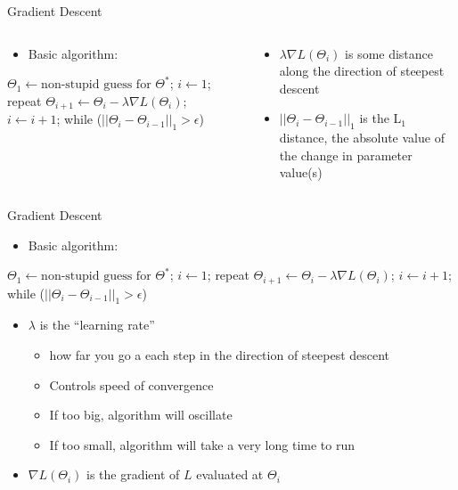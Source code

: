 \documentclass[aspectratio=169]{beamer}
\newenvironment{noindentitemize}
{ \begin{itemize}
 \setlength{\itemsep}{1.5ex}
  \setlength{\parsep}{0pt}   
  \setlength{\parskip}{0pt}
 \addtolength{\leftskip}{-2em}
 }
{ \end{itemize} }
\begin{document}
\begin{frame}[fragile]{Gradient Descent}

\begin{columns}[T]
\begin{column}{0.3\textwidth}
\begin{noindentitemize}
\item Basic algorithm:
\end{noindentitemize}
\begin{SQL}
$\Theta_1 \leftarrow \textrm{non-stupid guess for } \Theta^*$;
$i \leftarrow 1$;
repeat {
  $\Theta_{i + 1} \leftarrow \Theta_{i} - \lambda \nabla L (\Theta_{i})$;
  $i \leftarrow i + 1$;
} while ($||\Theta_{i} - \Theta_{i - 1}||_1 > \epsilon$)
\end{SQL} 
\end{column}
\begin{column}{0.7\textwidth}
\begin{itemize}
\vspace{3em}
\item  $\lambda \nabla L (\Theta_{i})$ is some distance along the direction of steepest descent
\item $||\Theta_{i} - \Theta_{i - 1}||_1$ is the L$_1$ distance, the absolute value of the change in parameter value(s)
\end{itemize}
\end{column}
\end{columns}

\end{frame}
\begin{frame}[fragile]{Gradient Descent}

\begin{noindentitemize}
\item Basic algorithm:
\end{noindentitemize}

\begin{SQL}
$\Theta_1 \leftarrow \textrm{non-stupid guess for } \Theta^*$;
$i \leftarrow 1$;
repeat {
  $\Theta_{i + 1} \leftarrow \Theta_{i} - \lambda \nabla L (\Theta_{i})$;
  $i \leftarrow i + 1$;
} while ($||\Theta_{i} - \Theta_{i - 1}||_1 > \epsilon$)
\end{SQL} 

\begin{itemize}
\item $\lambda$ is the ``learning rate''
\begin{itemize}
\item how far you go a each step in the direction of steepest descent
\item Controls speed of convergence
\item If too big, algorithm will oscillate
\item If too small, algorithm will take a very long time to run
\end{itemize}
\item $\nabla L (\Theta_{i})$ is the gradient of $L$ evaluated at $\Theta_{i}$
\end{itemize}

\end{frame}
\end{document}
